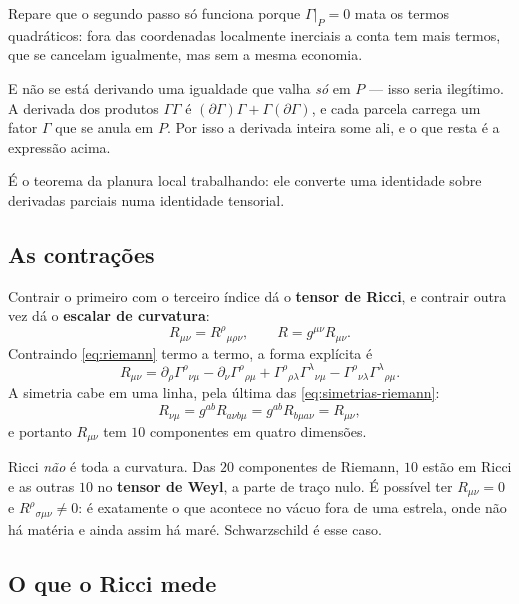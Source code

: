 \documentclass[12pt,a4paper,oneside]{book}
\theoremstyle{rgplain}
\theoremstyle{rgremark}
\begin{document}
Repare que o segundo passo só funciona porque $\Gamma|_P=0$ mata os termos
quadráticos: fora das coordenadas localmente inerciais a conta tem mais
termos, que se cancelam igualmente, mas sem a mesma economia.

E não se está derivando uma igualdade que valha \emph{só} em $P$ --- isso
seria ilegítimo. A derivada dos produtos $\Gamma\Gamma$ é
$(\partial\Gamma)\Gamma+\Gamma(\partial\Gamma)$, e cada parcela carrega um
fator $\Gamma$ que se anula em $P$. Por isso a derivada inteira some ali,
e o que resta é a expressão acima.

É o teorema da planura local trabalhando: ele converte uma identidade sobre
derivadas parciais numa identidade tensorial.

\subsection*{As contrações}

Contrair o primeiro com o terceiro índice dá o \textbf{tensor de Ricci}, e
contrair outra vez dá o \textbf{escalar de curvatura}:
\begin{equation}
  R_{\mu\nu}=R^\rho{}_{\mu\rho\nu} ,
  \qquad
  R=g^{\mu\nu}R_{\mu\nu} .
  \label{eq:ricci}
\end{equation}
Contraindo \eqref{eq:riemann} termo a termo, a forma explícita é
\begin{equation}
  R_{\mu\nu}=\partial_\rho\Gamma^\rho{}_{\nu\mu}
  -\partial_\nu\Gamma^\rho{}_{\rho\mu}
  +\Gamma^\rho{}_{\rho\lambda}\Gamma^\lambda{}_{\nu\mu}
  -\Gamma^\rho{}_{\nu\lambda}\Gamma^\lambda{}_{\rho\mu} .
  \label{eq:ricci-componentes}
\end{equation}
A simetria cabe em uma linha, pela última das
\eqref{eq:simetrias-riemann}:
\[
  R_{\nu\mu}=g^{ab}R_{a\nu b\mu}=g^{ab}R_{b\mu a\nu}=R_{\mu\nu} ,
\]
e portanto $R_{\mu\nu}$ tem $10$ componentes em quatro dimensões.

\begin{atencao}
Ricci \emph{não} é toda a curvatura. Das $20$ componentes de Riemann, $10$
estão em Ricci e as outras $10$ no \textbf{tensor de Weyl}, a parte de traço
nulo. É possível ter $R_{\mu\nu}=0$ e $R^\rho{}_{\sigma\mu\nu}\ne0$: é
exatamente o que acontece no vácuo fora de uma estrela, onde não há matéria e
ainda assim há maré. Schwarzschild é esse caso.
\end{atencao}

\subsection*{O que o Ricci mede}
\end{document}
